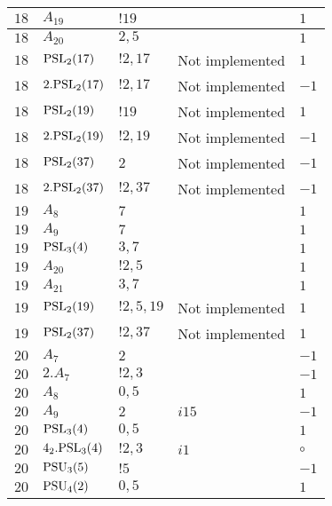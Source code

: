 \documentclass[a4paper, 11pt]{article}
\begin{document}
\begin{longtable}{lllll}
        $ 18 $ & $ A_{19} $ & $ !19 $ & $ ~ $ & $ 1$ \\ \hline
        $ 18 $ & $ A_{20} $ & $ 2, 5 $ & $ ~ $ & $ 1$ \\ \hline
        $ 18 $ & $ {\rm PSL}_{2}(17) $ & $ !2, 17 $ &  Not implemented & $ 1$ \\ \hline
        $ 18 $ & $ 2.{\rm PSL}_{2}(17) $ & $ !2, 17 $ &  Not implemented & $ -1$ \\ \hline
        $ 18 $ & $ {\rm PSL}_{2}(19) $ & $ !19 $ &  Not implemented & $ 1$ \\ \hline
        $ 18 $ & $ 2.{\rm PSL}_{2}(19) $ & $ !2, 19 $ &  Not implemented & $ -1$ \\ \hline
        $ 18 $ & $ {\rm PSL}_{2}(37) $ & $ 2 $ &  Not implemented & $ -1$ \\ \hline
        $ 18 $ & $ 2.{\rm PSL}_{2}(37) $ & $ !2, 37 $ &  Not implemented & $ -1$ \\ \hline
        $ 19 $ & $ A_{8} $ & $ 7 $ & $ ~ $ & $ 1$ \\ \hline
        $ 19 $ & $ A_{9} $ & $ 7 $ & $ ~ $ & $ 1$ \\ \hline
        $ 19 $ & $ {\rm PSL}_{3}(4) $ & $ 3, 7 $ & $ ~ $ & $ 1$ \\ \hline
        $ 19 $ & $ A_{20} $ & $ !2, 5 $ & $ ~ $ & $ 1$ \\ \hline
        $ 19 $ & $ A_{21} $ & $ 3, 7 $ & $ ~ $ & $ 1$ \\ \hline
        $ 19 $ & $ {\rm PSL}_{2}(19) $ & $ !2, 5, 19 $ &  Not implemented & $ 1$ \\ \hline
        $ 19 $ & $ {\rm PSL}_{2}(37) $ & $ !2, 37 $ &  Not implemented & $ 1$ \\ \hline
        $ 20 $ & $ A_{7} $ & $ 2 $ & $ ~ $ & $ -1$ \\ \hline
        $ 20 $ & $ 2.A_{7} $ & $ ! 2,3 $ & $ ~ $ & $ -1$ \\ \hline
        $ 20 $ & $ A_{8} $ & $ 0,5 $ & $ ~ $ & $ 1$ \\ \hline
        $ 20 $ & $ A_{9} $ & $ 2 $ & $ i15 $ & $ -1$ \\ \hline
        $ 20 $ & $ {\rm PSL}_{3}(4) $ & $ 0,5 $ & $ ~ $ & $ 1$ \\ \hline
        $ 20 $ & $ 4_2.{\rm PSL}_{3}(4) $ & $ ! 2,3 $ & $ i1 $ &  $\circ$ \\ \hline
        $ 20 $ & $ {\rm PSU}_{3}(5) $ & $ ! 5 $ & $ ~ $ & $ -1$ \\ \hline
        $ 20 $ & $ {\rm PSU}_{4}(2) $ & $ 0,5 $ & $ ~ $ & $ 1$ \\ \hline

\end{longtable}
\end{document}
